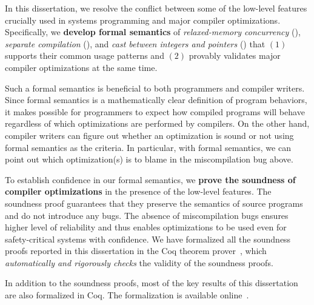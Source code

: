 In this dissertation, we resolve the conflict between some of the low-level features crucially used
in systems programming and major compiler optimizations.  Specifically, we \textbf{develop formal
  semantics} of \emph{relaxed-memory concurrency} (), \emph{separate compilation}
(), and \emph{cast between integers and pointers} () that
$(1)$ supports their common usage patterns and $(2)$ provably validates major compiler optimizations
at the same time.



Such a formal semantics is beneficial to both programmers and compiler writers.  Since formal
semantics is a mathematically clear definition of program behaviors, it makes possible for
programmers to expect how compiled programs will behave regardless of which optimizations are
performed by compilers.  On the other hand, compiler writers can figure out whether an optimization
is sound or not using formal semantics as the criteria.  In particular, with formal semantics, we
can point out which optimization(s) is to blame in the miscompilation bug above.

To establish confidence in our formal semantics, we \textbf{prove the soundness of compiler
  optimizations} in the presence of the low-level features.  The soundness proof guarantees that
they preserve the semantics of source programs and do not introduce any bugs.  The absence of
miscompilation bugs ensures higher level of reliability and thus enables optimizations to be used
even for safety-critical systems with confidence.  We have formalized all the soundness proofs
reported in this dissertation in the Coq theorem prover~\cite{coq}, which \emph{automatically and
  rigorously checks} the validity of the soundness proofs.

In addition to the soundness proofs, most of the key results of this dissertation are also
formalized in Coq.  The formalization is available online~\cite{kang-phd-thesis-web}.



